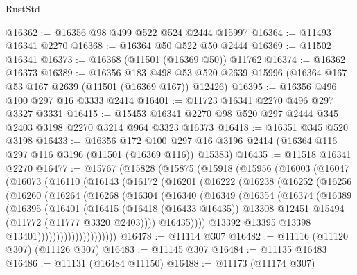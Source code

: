 \begin{lexlean}{RustStd}
\begin{coremodule}
@16362 := @16356 @98 @499 @522 @524 @2444 @15997
@16364 := @11493 @16341 @2270
@16368 := @16364 @50 @522 @50 @2444
@16369 := @11502 @16341
@16373 := @16368 (@11501 (@16369 @50)) @11762
@16374 := @16362 @16373
@16389 := @16356
    @183
    @498
    @53
    @520
    @2639
    @15996
    (@16364 @167 @53 @167 @2639 (@11501 (@16369 @167)) @12426)
@16395 := @16356 @496 @100 @297 @16 @3333 @2414
@16401 := @11723 @16341 @2270 @496 @297 @3327 @3331
@16415 := @15453 @16341 @2270 @98 @520 @297 @2444 @345 @2403 @3198 @2270 @3214 @964 @3323 @16373
@16418 := @16351 @345 @520 @3198
@16433 := @16356
    @172
    @100
    @297
    @16
    @3196
    @2414
    (@16364 @116 @297 @116 @3196 (@11501 (@16369 @116)) @15383)
@16435 := @11518 @16341 @2270
@16477 := @15767
    (@15828
      (@15875
        (@15918
          (@15956
            (@16003
              (@16047
                (@16073
                  (@16110
                    (@16143
                      (@16172
                        (@16201
                          (@16222
                            (@16238
                              (@16252
                                (@16256
                                  (@16260
                                    (@16264
                                      (@16268
                                        (@16304
                                          (@16340
                                            (@16349
                                              (@16354
                                                (@16374
                                                  (@16389
                                                    (@16395
                                                      (@16401
                                                        (@16415
                                                          (@16418 (@16433 @16435))
                                                          @13308
                                                          @12451
                                                          @15494
                                                          (@11772 (@11777 @3320 @2403))))
                                                      @16435))))
                                              @13392
                                              @13395
                                              @13398
                                              @13401)))))))))))))))))))))
@16478 := @11114 @307
@16482 := @11116 (@11120 @307) (@11126 @307)
@16483 := @11145 @307
@16484 := @11135 @16483
@16486 := @11131 (@16484 @11150)
@16488 := @11173 (@11174 @307)

\end{coremodule}
\end{lexlean}
